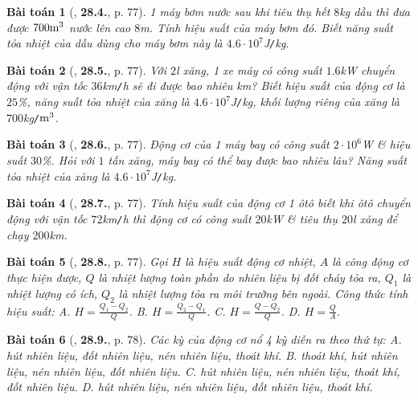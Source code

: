 \documentclass{article}
\numberwithin{equation}{section}
\newtheorem{baitoan}{Bài toán}
\begin{document}
\begin{baitoan}[\cite{SBT_Vat_Ly_8}, \textbf{28.4.}, p. 77]
	1 máy bơm nước sau khi tiêu thụ hết $8$\emph{kg} dầu thì đưa được $700\rm m^3$ nước lên cao $8$\emph{m}. Tính hiệu suất của máy bơm đó. Biết năng suất tỏa nhiệt của dầu dùng cho máy bơm này là  $4.6\cdot10^7$\emph{J\texttt{/}kg}.
\end{baitoan}

\begin{baitoan}[\cite{SBT_Vat_Ly_8}, \textbf{28.5.}, p. 77]
	Với $2$\emph{l} xăng, 1 xe máy có công suất $1.6$\emph{kW} chuyển động với vận tốc $36$\emph{km\texttt{/}h} sẽ đi được bao nhiêu \emph{km}? Biết hiệu suất của động cơ là $25$\%, năng suất tỏa nhiệt của xăng là $4.6\cdot10^7$\emph{J\texttt{/}kg}, khối lượng riêng của xăng là $700$\emph{kg\texttt{/}$\rm m^3$}.
\end{baitoan}

\begin{baitoan}[\cite{SBT_Vat_Ly_8}, \textbf{28.6.}, p. 77]
	Động cơ của 1 máy bay có công suất $2\cdot10^6$\emph{W} \& hiệu suất $30$\%. Hỏi với $1$ tấn xăng, máy bay có thể bay được bao nhiêu lâu? Năng suất tỏa nhiệt của xăng là $4.6\cdot10^7$\emph{J\texttt{/}kg}.
\end{baitoan}

\begin{baitoan}[\cite{SBT_Vat_Ly_8}, \textbf{28.7.}, p. 77]
	Tính hiệu suất của động cơ 1 ôtô biết khi ôtô chuyển động với vận tốc $72$\emph{km\texttt{/}h} thì động cơ có công suất $20$\emph{kW} \& tiêu thụ $20$\emph{l} xăng để chạy $200$\emph{km}.
\end{baitoan}

\begin{baitoan}[\cite{SBT_Vat_Ly_8}, \textbf{28.8.}, p. 77]
	Gọi $H$ là hiệu suất động cơ nhiệt, $A$ là công động cơ thực hiện được, $Q$ là nhiệt lượng toàn phần do nhiên liệu bị đốt cháy tỏa ra, $Q_1$ là nhiệt lượng có ích, $Q_2$ là nhiệt lượng tỏa ra môi trường bên ngoài. Công thức tính hiệu suất: {\sf A.} $H = \frac{Q_1 - Q_2}{Q}$. {\sf B.} $H = \frac{Q_2 - Q_1}{Q}$. {\sf C.} $H = \frac{Q - Q_2}{Q}$. {\sf D.} $H = \frac{Q}{A}$. 
\end{baitoan}

\begin{baitoan}[\cite{SBT_Vat_Ly_8}, \textbf{28.9.}, p. 78]
	Các kỳ của động cơ nổ 4 kỳ diễn ra theo thứ tự: {\sf A.} hút nhiên liệu, đốt nhiên liệu, nén nhiên liệu, thoát khí. {\sf B.} thoát khí, hút nhiên liệu, nén nhiên liệu, đốt nhiên liệu. {\sf C.} hút nhiên liệu, nén nhiên liệu, thoát khí, đốt nhiên liệu. {\sf D.} hút nhiên liệu, nén nhiên liệu, đốt nhiên liệu, thoát khí.
\end{baitoan}
\end{document}
